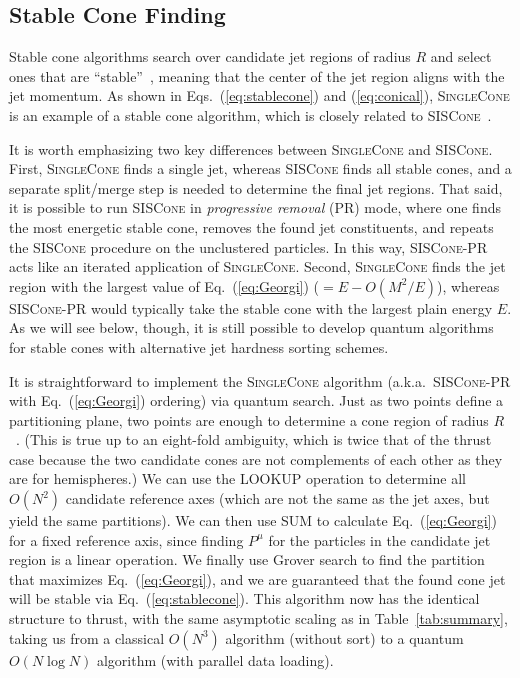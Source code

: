 \documentclass[aps,prd,twocolumn,superscriptaddress,preprintnumbers,nofootinbib,longbibliography,floatfix]{revtex4-1}
\DeclareRobustCommand{\Tab}[1]{Table~\ref{#1}}
\DeclareRobustCommand{\Eq}[1]{Eq.~(\ref{#1})}
\DeclareRobustCommand{\Eqs}[2]{Eqs.~(\ref{#1}) and (\ref{#2})}
\begin{document}
\subsection{Stable Cone Finding}
\label{subsec:siscone}

Stable cone algorithms search over candidate jet regions of radius $R$ and select ones that are ``stable''~\cite{Blazey:2000qt, Ellis:2001aa}, meaning that the center of the jet region aligns with the jet momentum.
%
As shown in \Eqs{eq:stablecone}{eq:conical}, \textsc{SingleCone} is an example of a stable cone algorithm, which is closely related to \textsc{SISCone}~\cite{Salam:2007xv}.


It is worth emphasizing two key differences between \textsc{SingleCone} and \textsc{SISCone}.
%
First, \textsc{SingleCone} finds a single jet, whereas \textsc{SISCone} finds all stable cones, and a separate split/merge step is needed to determine the final jet regions.
%
That said, it is possible to run \textsc{SISCone} in \emph{progressive removal} (PR) mode, where one finds the most energetic stable cone, removes the found jet constituents, and repeats the \textsc{SISCone} procedure on the unclustered particles.
%
In this way, \textsc{SISCone-PR} acts like an iterated application of \textsc{SingleCone}.
%
Second, \textsc{SingleCone} finds the jet region with the largest value of \Eq{eq:Georgi} ($= E - O(M^2/E)$), whereas \textsc{SISCone-PR} would typically take the stable cone with the largest plain energy $E$.
%
As we will see below, though, it is still possible to develop quantum algorithms for stable cones with alternative jet hardness sorting schemes.


It is straightforward to implement the \textsc{SingleCone} algorithm (a.k.a.~\textsc{SISCone-PR} with \Eq{eq:Georgi} ordering) via quantum search.
%
Just as two points define a partitioning plane, two points are enough to determine a cone region of radius $R$~\cite{Salam:2007xv}.
%
(This is true up to an eight-fold ambiguity, which is twice that of the thrust case because the two candidate cones are not complements of each other as they are for hemispheres.)
%
We can use the LOOKUP operation to determine all $O(N^2)$ candidate reference axes (which are not the same as the jet axes, but yield the same partitions).
%
We can then use SUM to calculate \Eq{eq:Georgi} for a fixed reference axis, since finding $P^\mu$ for the particles in the candidate jet region is a linear operation.
%
We finally use Grover search to find the partition that maximizes \Eq{eq:Georgi}, and we are guaranteed that the found cone jet will be stable via \Eq{eq:stablecone}. 
%
This algorithm now has the identical structure to thrust, with the same asymptotic scaling as in \Tab{tab:summary}, taking us from a classical $O(N^3)$ algorithm (without sort) to a quantum $O(N \log N)$ algorithm (with parallel data loading).
\end{document}
